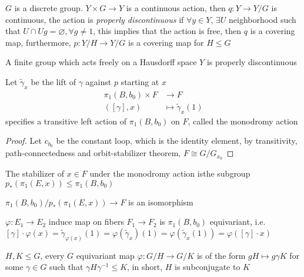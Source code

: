 \documentclass[../main.tex]{subfiles}
\begin{document}
\begin{definition}
$G$ is a discrete group. $Y\times G\to Y$ is a continuous action, then $q:Y\to Y/G$ is continuous, the action is \textit{properly discontinuous} if $\forall y\in Y$, $\exists U$ neighborhood such that $U\cap Ug=\varnothing,\forall g\neq1$, this implies that the action is free, then $q$ is a covering map, furthermore, $p:Y/H\to Y/G$ is a covering map for $H\leq G$
\end{definition}

\begin{fact}
A finite group which acts freely on a Hausdorff space $Y$ is properly discontinuous
\end{fact}

\begin{theorem}[Monodromy]
Let $\tilde\gamma_x$ be the lift of $\gamma$ against $p$ starting at $x$
\begin{align*}
\pi_1(B,b_0)\times F&\to F \\
([\gamma],x)&\mapsto\tilde\gamma_x(1)
\end{align*}
specifies a transitive left action of $\pi_1(B,b_0)$ on $F$, called the monodromy action
\end{theorem}

\begin{proof}
Let $c_{b_0}$ be the constant loop, which is the identity element, by transitivity, path-connectedness and orbit-stabilizer theorem, $F\cong G/G_{x_0}$
\end{proof}

\begin{proposition}
The stabilizer of $x\in F$ under the monodromy action isthe subgroup $p_*(\pi_1(E,x))\leq\pi_1(B,b_0)$
\end{proposition}

\begin{corollary}
$\pi_1(B,b_0)/p_*(\pi_1(E,x))\to F$ is an isomorphism
\end{corollary}

\begin{proposition}
$\varphi:E_1\to E_2$ induce map on fibers $F_1\to F_2$ is $\pi_1(B,b_0)$ equivariant, i.e. $[\gamma]\cdot\varphi(x)=\tilde\gamma_{\varphi(x)}(1)=\varphi(\tilde\gamma_x)(1)=\varphi(\tilde\gamma_x(1))=\varphi([\gamma]\cdot x)$
\end{proposition}

\begin{proposition}
$H,K\leq G$, every $G$ equivariant map $\varphi:G/H\to G/K$ is of the form $gH\mapsto g\gamma K$ for some $\gamma\in G$ such that $\gamma H\gamma^{-1}\leq K$, in short, $H$ is subconjugate to $K$
\end{proposition}
\end{document}
